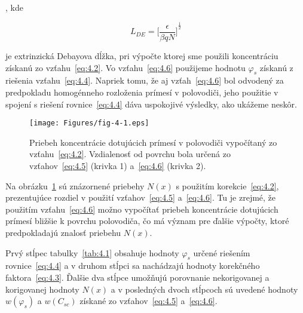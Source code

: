 , kde 

\begin{equation}\label{eq:4.7}
  L_{DE} = {\Big[\frac{\epsilon}{\beta qN}\Big]}^{\frac{1}{2}}
\end{equation}

je extrinzická Debayova dĺžka, pri výpočte ktorej sme použili
koncentráciu získanú zo vzťahu~\ref{eq:4.2}.  Vo vzťahu~\ref{eq:4.6}
použijeme hodnotu $\varphi_{s}$ získanú z riešenia
vzťahu~\ref{eq:4.4}.  Napriek tomu, že aj vzťah~\ref{eq:4.6} bol
odvodený za predpokladu homogénneho rozloženia prímesí v polovodiči,
jeho použitie v spojení s riešení rovnice~\ref{eq:4.4} dáva uspokojivé
výsledky, ako ukážeme neskôr.

\begin{figure}[h!]\centering
  \texttt{[image: Figures/fig-4-1.eps]}%
  \caption[Priebeh koncentrácie dotujúcich prímesí v polovodiči
    vypočítaný zo vzťahu~\ref{eq:4.2}]{Priebeh koncentrácie dotujúcich
    prímesí v polovodiči vypočítaný zo
    vzťahu~\ref{eq:4.2}. Vzdialenosť od povrchu bola určená zo
    vzťahov~\ref{eq:4.5} (krivka 1) a~\ref{eq:4.6} (krivka
    2).}\label{fig:4.1}
\end{figure}

Na obrázku~\ref{fig:4.1} sú znázornené priebehy $N(x)$ s použitím
korekcie~\ref{eq:4.2}, prezentujúce rozdiel v použití
vzťahov~\ref{eq:4.5} a~\ref{eq:4.6}. Tu je zrejmé, že použitím
vzťahu~\ref{eq:4.6} možno vypočítať priebeh koncentrácie dotujúcich
prímesí bližšie k povrchu polovodiča, čo má význam pre ďalšie výpočty,
ktoré predpokladajú znalosť priebehu $N(x)$.

Prvý stĺpec tabulky~\ref{tab:4.1} obsahuje hodnoty $\varphi_{s}$
určené riešením rovnice~\ref{eq:4.4} a v druhom stĺpci sa nachádzajú
hodnoty korekčného faktora~\ref{eq:4.3}. Ďalšie dva stĺpce umožňujú
porovnanie nekorigovanej a korigovanej hodnoty $N(x)$ a v posledných
dvoch stĺpcoch sú uvedené hodnoty $w(\varphi_{s})$ a $w(C_{sc})$
získané zo vzťahov~\ref{eq:4.5} a~\ref{eq:4.6}.

